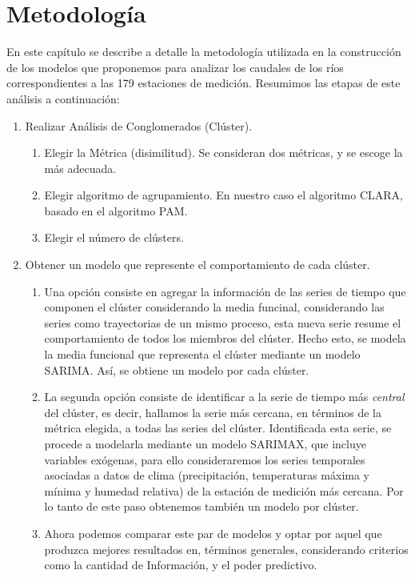 \documentclass[12pt,oneside]{book}\usepackage[]{graphicx}\usepackage[]{color}
\theoremstyle{definition} %
\begin{document}

\chapter{Metodología} \label{cap2}


En este capítulo se describe a detalle la metodología utilizada en la construcción de los modelos que proponemos para analizar los caudales de los ríos correspondientes a las 179 estaciones de medición. Resumimos las etapas de este análisis a continuación:

\begin{enumerate}

\item Realizar Análisis de Conglomerados (Clúster).
\begin{enumerate}
\item Elegir la Métrica (disimilitud). Se consideran dos métricas, y se escoge la más adecuada.
\item Elegir algoritmo de agrupamiento. En nuestro caso el algoritmo CLARA, basado en el algoritmo PAM.
\item Elegir el número de clústers.
\end{enumerate}

\item Obtener un modelo que represente el comportamiento de cada clúster.

\begin{enumerate}
\item Una opción consiste en agregar la información de las series de tiempo que componen el clúster considerando la media funcinal, considerando las series como trayectorias de un mismo proceso, esta nueva serie resume el comportamiento de todos los miembros del clúster. Hecho esto, se modela la media funcional que representa el clúster mediante un modelo SARIMA. Así, se obtiene un modelo por cada clúster.
\item La segunda opción consiste de identificar a la serie de tiempo más \textit{central} del clúster, es decir, hallamos la serie más cercana, en términos de la métrica elegida, a todas las series del clúster. Identificada esta serie, se procede a modelarla mediante un modelo SARIMAX, que incluye variables exógenas, para ello consideraremos los series temporales asociadas a datos de clima (precipitación, temperaturas máxima y mínima y humedad relativa) de la estación de medición más cercana. Por lo tanto de este paso obtenemos también un modelo por clúster.
\item Ahora podemos comparar este par de modelos y optar por aquel que produzca mejores resultados en, términos generales, considerando criterios como la cantidad de Información, y el poder predictivo.


\end{enumerate}
\end{enumerate}
\end{document}
